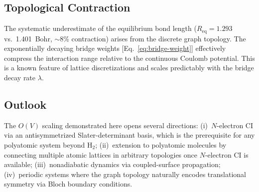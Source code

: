 \documentclass[aps,pra,twocolumn,superscriptaddress,longbibliography,floatfix]{revtex4-2}
\begin{document}
\subsection{Topological Contraction}
\label{sec:contraction}

The systematic underestimate of the equilibrium bond length
($R_{\mathrm{eq}} = 1.293$ vs.\ 1.401~Bohr, $\sim$8\% contraction)
arises from the discrete graph topology. The exponentially decaying
bridge weights [Eq.~\eqref{eq:bridge-weight}] effectively compress
the interaction range relative to the continuous Coulomb potential.
This is a known feature of lattice discretizations and scales
predictably with the bridge decay rate $\lambda$.

\subsection{Outlook}
\label{sec:outlook}

The $O(V)$ scaling demonstrated here opens several directions:
(i)~$N$-electron CI via an antisymmetrized Slater-determinant basis,
which is the prerequisite for any polyatomic system beyond
$\mathrm{H}_2$; (ii)~extension to polyatomic molecules by connecting
multiple atomic lattices in arbitrary topologies once $N$-electron
CI is available; (iii)~nonadiabatic dynamics via coupled-surface
propagation; (iv)~periodic systems where the graph topology naturally
encodes translational symmetry via Bloch boundary conditions.
\end{document}
